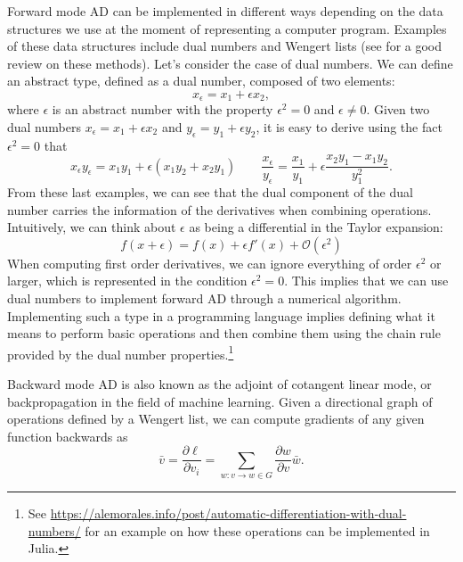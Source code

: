 Forward mode AD can be implemented in different ways depending on the data structures we use at the moment of representing a computer program. Examples of these data structures include dual numbers and Wengert lists (see \cite{Baydin_Pearlmutter_Radul_Siskind_2015} for a good review on these methods). Let's consider the case of dual numbers.
We can define an abstract type, defined as a dual number, composed of two elements:
\begin{equation}
 x_\epsilon = x_1 + \epsilon x_2,
\end{equation}
where $\epsilon$ is an abstract number with the property $\epsilon^2 = 0$ and $\epsilon \neq 0$.
Given two dual numbers $x_\epsilon = x_1 + \epsilon x_2$ and $y_\epsilon = y_1 + \epsilon y_2$, it is easy to derive using the fact $\epsilon^2=0$ that
\begin{equation}
 x_\epsilon y_\epsilon = x_1 y_1 + \epsilon(x_1 y_2 + x_2 y_1) \qquad
 \frac{x_\epsilon}{y_\epsilon} = \frac{x_1}{y_1} + \epsilon \frac{x_2 y_1 - x_1 y_2}{y_1^2}.
\end{equation}
From these last examples, we can see that the dual component of the dual number carries the information of the derivatives when combining operations.
Intuitively, we can think about $\epsilon$ as being a differential in the Taylor expansion:
\begin{equation}
 f(x + \epsilon) = f(x) + \epsilon f'(x) + \mathcal O (\epsilon^2)
\end{equation}
When computing first order derivatives, we can ignore everything of order $\epsilon^2$ or larger, which is represented in the condition $\epsilon^2 = 0$.
This implies that we can use dual numbers to implement forward AD through a numerical algorithm. Implementing such a type in a programming language implies defining what it means to perform basic operations and then combine them using the chain rule provided by the dual number properties.\footnote{See \url{https://alemorales.info/post/automatic-differentiation-with-dual-numbers/} for an example on how these operations can be implemented in Julia.}

Backward mode AD is also known as the adjoint of cotangent linear mode, or backpropagation in the field of machine learning. Given a directional graph of operations defined by a Wengert list, we can compute gradients of any given function backwards as
\begin{equation}
 \bar v = \frac{\partial \ell}{\partial v_i}= \sum_{w : v \rightarrow w \in G} \frac{\partial w}{\partial v} \bar{w}.
\end{equation}

